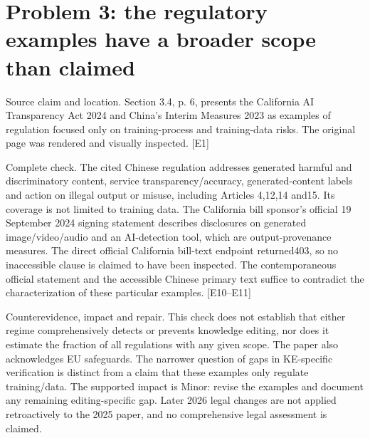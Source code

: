 \documentclass[10pt]{article}
\begin{document}
\section*{Problem 3: the regulatory examples have a broader scope than claimed}
Source claim and location. Section 3.4, p. 6, presents the California AI Transparency Act 2024 and China’s Interim Measures 2023 as examples of regulation focused only on training-process and training-data risks. The original page was rendered and visually inspected. [E1]\par
Complete check. The cited Chinese regulation addresses generated harmful and discriminatory content, service transparency/accuracy, generated-content labels and action on illegal output or misuse, including Articles 4,12,14 and15. Its coverage is not limited to training data. The California bill sponsor’s official 19 September 2024 signing statement describes disclosures on generated image/video/audio and an AI-detection tool, which are output-provenance measures. The direct official California bill-text endpoint returned403, so no inaccessible clause is claimed to have been inspected. The contemporaneous official statement and the accessible Chinese primary text suffice to contradict the characterization of these particular examples. [E10–E11]\par
Counterevidence, impact and repair. This check does not establish that either regime comprehensively detects or prevents knowledge editing, nor does it estimate the fraction of all regulations with any given scope. The paper also acknowledges EU safeguards. The narrower question of gaps in KE-specific verification is distinct from a claim that these examples only regulate training/data. The supported impact is Minor: revise the examples and document any remaining editing-specific gap. Later 2026 legal changes are not applied retroactively to the 2025 paper, and no comprehensive legal assessment is claimed.\par
\end{document}
